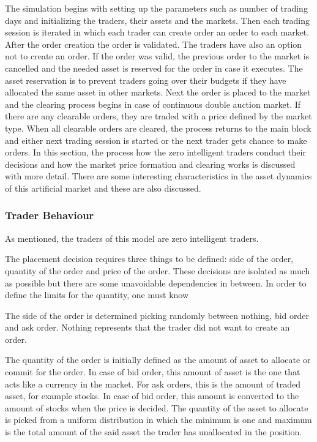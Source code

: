 The simulation begins with setting up the parameters such as number of
trading days and initializing the traders, their assets and the markets.
Then each trading session is iterated in which each trader can create order 
an order to each market. After the order creation the order is validated.
The traders have also an option not to create an order. If the order was
valid, the previous order to the market is cancelled and the needed 
asset is reserved for the order in case it executes. The asset
reservation is to prevent traders going over their budgets if they
have allocated the same asset in other markets. Next the order is
placed to the market and the clearing process begins in case of 
continuous double auction market. If there are any clearable orders,
they are traded with a price defined by the market type. When
all clearable orders are cleared, the process returns to the
main block and either next trading session is started or the next
trader gets chance to make orders. In this section, the process how the
zero intelligent traders conduct their decisions and how the 
market price formation and clearing works is discussed with more detail.
There are some interesting characteristics in the asset dynamics of this
artificial market and these are also discussed.

\subsubsection{Trader Behaviour}

As mentioned, the traders of this model are zero intelligent
traders.

The placement decision requires three things to be defined: 
side of the order, quantity of the order and price of the order. 
These decisions are isolated as much as possible but there 
are some unavoidable dependencies in between. In order to
define the limits for the quantity, one must know 

The side of the order is determined picking randomly
between nothing, bid order and ask order. Nothing
represents that the trader did not want to create 
an order.

The quantity of the order is initially defined as the
amount of asset to allocate or commit for the order. 
In case of bid order, this amount of asset is the one that acts
like a currency in the market. For ask orders, this 
is the amount of traded asset, for example stocks. In 
case of bid order, this amount is converted to the 
amount of stocks when the price is decided. The quantity
of the asset to allocate is picked from a uniform distribution
in which the minimum is one and maximum is the total 
amount of the said asset the trader has unallocated in the
position. 

